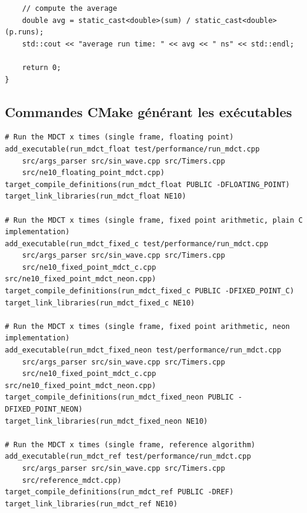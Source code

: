 \documentclass{article}
\begin{document}
\begin{appendix}
\begin{lstlisting}
    // compute the average
    double avg = static_cast<double>(sum) / static_cast<double>(p.runs);
    std::cout << "average run time: " << avg << " ns" << std::endl;

    return 0;
}
        \end{lstlisting}



        \subsection{Commandes CMake générant les exécutables}
        \label{an:cmake_run_mdcts}
        \begin{lstlisting}
# Run the MDCT x times (single frame, floating point)
add_executable(run_mdct_float test/performance/run_mdct.cpp
    src/args_parser src/sin_wave.cpp src/Timers.cpp
    src/ne10_floating_point_mdct.cpp)
target_compile_definitions(run_mdct_float PUBLIC -DFLOATING_POINT)
target_link_libraries(run_mdct_float NE10)

# Run the MDCT x times (single frame, fixed point arithmetic, plain C implementation)
add_executable(run_mdct_fixed_c test/performance/run_mdct.cpp
    src/args_parser src/sin_wave.cpp src/Timers.cpp
    src/ne10_fixed_point_mdct_c.cpp src/ne10_fixed_point_mdct_neon.cpp)
target_compile_definitions(run_mdct_fixed_c PUBLIC -DFIXED_POINT_C)
target_link_libraries(run_mdct_fixed_c NE10)

# Run the MDCT x times (single frame, fixed point arithmetic, neon implementation)
add_executable(run_mdct_fixed_neon test/performance/run_mdct.cpp
    src/args_parser src/sin_wave.cpp src/Timers.cpp
    src/ne10_fixed_point_mdct_c.cpp src/ne10_fixed_point_mdct_neon.cpp)
target_compile_definitions(run_mdct_fixed_neon PUBLIC -DFIXED_POINT_NEON)
target_link_libraries(run_mdct_fixed_neon NE10)

# Run the MDCT x times (single frame, reference algorithm)
add_executable(run_mdct_ref test/performance/run_mdct.cpp
    src/args_parser src/sin_wave.cpp src/Timers.cpp
    src/reference_mdct.cpp)
target_compile_definitions(run_mdct_ref PUBLIC -DREF)
target_link_libraries(run_mdct_ref NE10)
        \end{lstlisting}




    \end{appendix}
\end{document}
